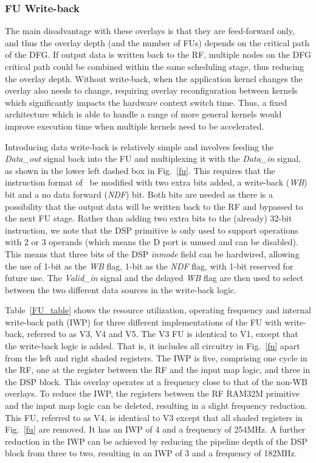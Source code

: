 \subsubsection{FU Write-back}
The main disadvantage with these overlays is that they are feed-forward only, and thus the overlay depth (and the number of FUs) depends on the critical path of the DFG. 
If output data is written back to the RF, multiple nodes on the DFG critical path could be combined within the same scheduling stage, thus reducing the overlay depth.
Without write-back, when the application kernel changes the overlay also needs to change, requiring overlay reconfiguration between kernels which significantly impacts the hardware context switch time. 
Thus, a fixed architecture which is able to handle a range of more general kernels would improve execution time when multiple kernels need to be accelerated.

Introducing data write-back is relatively simple and involves feeding the \textit{Data\_out} signal back into the FU and multiplexing it with the \textit{Data\_in} signal, as shown in the lower left dashed box in Fig.~\ref{fu}. 
This requires that the instruction format of~\cite{li2016area} be modified with two extra bits added, a write-back (\textit{WB}) bit and a no data forward (\textit{NDF}) bit. 
Both bits are needed as there is a possibility that the output data will be written back to the RF and bypassed to the next FU stage. Rather than adding two extra bits to the (already) 32-bit instruction, we note that the DSP primitive is only used to support operations with 2 or 3 operands (which means the D port is unused and can be disabled). This means that three bits of the DSP \textit{inmode} field can be hardwired, allowing the use of 1-bit as the \textit{WB} flag, 1-bit as the \textit{NDF} flag, with 1-bit reserved for future use.
The \textit{Valid\_in} signal and the delayed \textit{WB} flag are then used to select between the two different data sources in the write-back logic.

Table~\ref{FU_table} shows the resource utilization, operating frequency and internal write-back path (IWP) for three different implementations of the FU with write-back, referred to as V3, V4 and V5.
The V3 FU is identical to V1, except that the write-back logic is added. That is, it includes all circuitry in Fig.~\ref{fu} apart from the left and right shaded registers.
The IWP is five, comprising one cycle in the RF, one at the register between the RF and the input map logic, and three in the DSP block. This overlay operates at a frequency close to that of the non-WB overlays. 
To reduce the IWP, the registers between the RF RAM32M primitive and the input map logic can be deleted, resulting in a slight frequency reduction. 
This FU, referred to as V4, is identical to V3 except that all shaded registers in Fig.~\ref{fu} are removed. It has an IWP of 4 and a frequency of 254MHz. A further reduction in the IWP can be achieved by reducing the pipeline depth of the DSP block from three to two, resulting in an IWP of 3 and a frequency of 182MHz.

